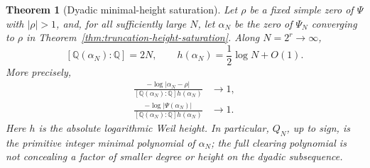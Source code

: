 \documentclass[11pt]{article}
\newtheorem{theorem}{Theorem}[section]
\theoremstyle{definition}
\theoremstyle{remark}
\newcommand{\Q}{\mathbb Q}
\begin{document}
\begin{theorem}[Dyadic minimal-height saturation]
\label{thm:dyadic-minimal-height-saturation}
Let \(\rho\) be a fixed simple zero of \(\Psi\) with \(|\rho|>1\), and,
for all sufficiently large \(N\), let \(\alpha_N\) be the zero of
\(\Psi_N\) converging to \(\rho\) in
Theorem~\ref{thm:truncation-height-saturation}.  Along
\(N=2^r\to\infty\),
\begin{equation}\label{eq:dyadic-degree-height}
 [\Q(\alpha_N):\Q]=2N,
 \qquad
 h(\alpha_N)=\frac12\log N+O(1).
\end{equation}
More precisely,
\begin{align}
 \frac{-\log|\alpha_N-\rho|}
 {[\Q(\alpha_N):\Q]h(\alpha_N)}&\longrightarrow1,
 \label{eq:dyadic-root-height-ratio}\\
 \frac{-\log|\Psi(\alpha_N)|}
 {[\Q(\alpha_N):\Q]h(\alpha_N)}&\longrightarrow1.
 \label{eq:dyadic-value-height-ratio}
\end{align}
Here \(h\) is the absolute logarithmic Weil height.  In particular,
\(Q_N\), up to sign, is the primitive integer minimal polynomial of
\(\alpha_N\); the full clearing polynomial is not concealing a factor of
smaller degree or height on the dyadic subsequence.
\end{theorem}
\end{document}
